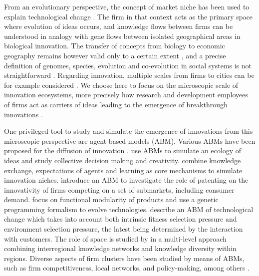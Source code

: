 \documentclass[letterpaper]{article}
\begin{document}
From an evolutionary perspective, the concept of market niche has been used to explain technological change \citep{schot2007niches}. The firm in that context acts as the primary space where evolution of ideas occurs, and knowledge flows between firms can be understood in analogy with gene flows between isolated geographical areas in biological innovation. The transfer of concepts from biology to economic geography remains however valid only to a certain extent \citep{schamp2010notion}, and a precise definition of genomes, species, evolution and co-evolution in social systems is not straightforward \citep{raimbault2019modeling}. Regarding innovation, multiple scales from firms to cities can be for example considered \citep{raimbault2020model}. We choose here to focus on the microscopic scale of innovation ecosystems, more precisely how research and development employees of firms act as carriers of ideas leading to the emergence of breakthrough innovations \citep{song2016innovation}.

One privileged tool to study and simulate the emergence of innovations from this microscopic perspective are agent-based models (ABM). Various ABMs have been proposed for the diffusion of innovation \citep{kiesling2012agent}. \cite{sayama2015studying} use ABMs to simulate an ecology of ideas and study collective decision making and creativity. \cite{lopolito2013emerging} combine knowledge exchange, expectations of agents and learning as core mechanisms to simulate innovation niches. \cite{dosi2021patents} introduce an ABM to investigate the role of patenting on the innovativity of firms competing on a set of submarkets, including consumer demand. \cite{chen2006functional} focus on functional modularity of products and use a genetic programming formalism to evolve technologies. \cite{ma2005agent} describe an ABM of technological change which takes into account both intrinsic fitness selection pressure and environment selection pressure, the latest being determined by the interaction with customers. The role of space is studied by \cite{vermeulen2018role} in a multi-level approach combining interregional knowledge networks and knowledge diversity within regions. Diverse aspects of firm clusters have been studied by means of ABMs, such as firm competitiveness, local networks, and policy-making, among others \citep{fioretti2005agent}.
\end{document}
